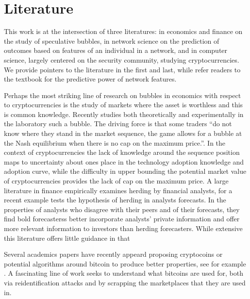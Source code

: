 \section{Literature}
This work is at the intersection of three literatures: in economics and finance on the study of speculative bubbles, in network science on the prediction of outcomes based on features of an individual in a network, and in computer science, largely centered on the security community, studying cryptocurrencies.
We provide pointers to the literature in the first and last, while refer readers to the textbook \cite{KleinbergNetworks} for the predictive power of network features. 

Perhaps the most striking line of research on bubbles in economics with respect to cryptocurrencies is the study of markets where the asset is worthless and this is common knowledge. 
Recently \cite{moinas2013bubble} studies both theoretically and experimentally in the laboratory such a bubble. 
The driving force is that some traders ``do not know where they stand in the market sequence, the game allows for
a bubble at the Nash equilibrium when there is no cap on the maximum price.''.
In the context of cryptocurrencies the lack of knowledge around the sequence position maps to uncertainty about ones place in the technology adoption knowledge and adoption curve, while the difficulty in upper bounding the potential market value of cryptocurrencies provides the lack of cap on the maximum price. 
A large literature in finance empirically examines herding by financial analysts, for a recent example\cite{jegadeesh2009analysts} tests the hypothesis of herding in analysts forecasts. 
In  \cite{clement2005financial} the properties of analysts who disagree with their peers and of their forecasts, they find bold forecasterss better incorporate analysts' private information and offer more relevant information to investors than herding forecasters.
While extensive this literature offers little guidance in that 

Several academics papers have recently appeard proposing cryptocoins or potential algorithms around bitcoin to produce better properties, see for example \cite{bonneau2014mixcoin}.
A fascinating line of work \cite{meiklejohn2013fistful, soska2015measuring} seeks to understand what bitcoins are used for, both via reidentification attacks and by scrapping the marketplaces that they are used in.

